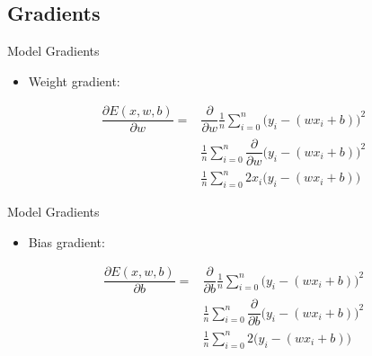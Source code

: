 \subsection{Gradients}
\begin{frame}{Model Gradients}
	\begin{itemize}
		\item Weight gradient:
	\end{itemize}
	\begin{align*}
	\dfrac{\partial E(x,w,b)}{\partial w} =& \dfrac{\partial}{\partial w} \frac{1}{n}\sum_{i = 0}^n \Big(y_i - (wx_i + b)\Big)^2\\
	& \frac{1}{n}\sum_{i = 0}^n \dfrac{\partial}{\partial w}\Big(y_i - (wx_i + b)\Big)^2\\
	& \frac{1}{n}\sum_{i = 0}^n 2x_i \Big(y_i - (wx_i + b)\Big)
	\end{align*}
\end{frame}

\begin{frame}{Model Gradients}
	\begin{itemize}
		\item Bias gradient:
	\end{itemize}
	\begin{align*}
	\dfrac{\partial E(x,w,b)}{\partial b} =& \dfrac{\partial}{\partial b} \frac{1}{n}\sum_{i = 0}^n \Big(y_i - (wx_i + b)\Big)^2\\
	& \frac{1}{n}\sum_{i = 0}^n \dfrac{\partial}{\partial b}\Big(y_i - (wx_i + b)\Big)^2\\
	& \frac{1}{n}\sum_{i = 0}^n 2 \Big(y_i - (wx_i + b)\Big)
	\end{align*}
\end{frame}

